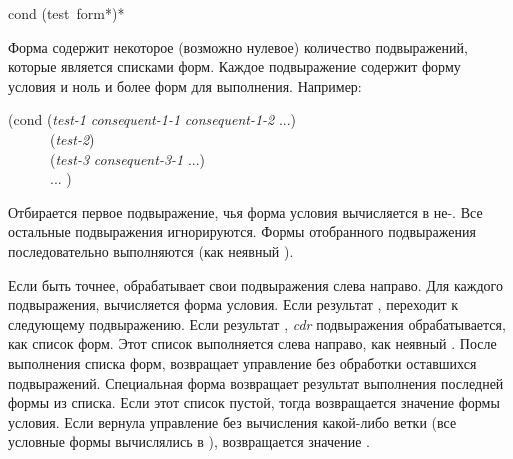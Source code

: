 \begin{defmac}
cond {(test {\,form}*)}*

Форма  содержит некоторое (возможно нулевое) количество подвыражений,
которые является списками форм.
Каждое подвыражение содержит форму условия и ноль и более форм для выполнения.
Например:
\begin{lisp}
(cond (\emph{test-1} \emph{consequent-1-1} \emph{consequent-1-2} ...) \\
~~~~~~(\emph{test-2}) \\
~~~~~~(\emph{test-3} \emph{consequent-3-1} ...) \\
~~~~~~... )
\end{lisp}

Отбирается первое подвыражение, чья форма условия вычисляется в не-{\false}. Все
остальные подвыражения игнорируются. Формы отобранного подвыражения
последовательно выполняются (как неявный ).

Если быть точнее,  обрабатывает свои подвыражения слева направо. Для
каждого подвыражения, вычисляется форма условия. Если результат {\false},
 переходит к следующему подвыражению. Если результат {\true},
\emph{cdr} подвыражения обрабатывается, как список форм. Этот список выполняется
слева направо, как неявный .
После выполнения списка форм,  возвращает управление без обработки
оставшихся подвыражений.
Специальная форма  возвращает результат выполнения последней формы из
списка. Если этот список пустой, тогда возвращается значение формы условия.
Если  вернула управление без вычисления какой-либо ветки (все условные
формы вычислялись в {\false}), возвращается значение {\false}.


\end{defmac}
